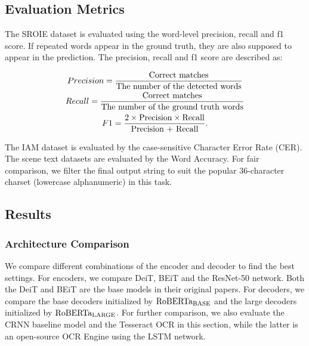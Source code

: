 \documentclass[letterpaper]{article} \usepackage{aaai23}  \usepackage{times}  \usepackage{helvet}  \usepackage{courier}  \usepackage[hyphens]{url}  \usepackage{graphicx} \urlstyle{rm} \def\UrlFont{\rm}  \usepackage{natbib}  \usepackage{caption} \frenchspacing  \setlength{\pdfpagewidth}{8.5in} \setlength{\pdfpageheight}{11in} \usepackage{algorithm}
\begin{document}
\subsection{Evaluation Metrics}
The SROIE dataset is evaluated using the word-level precision, recall and f1 score. If repeated words appear in the ground truth, they are also supposed to appear in the prediction. The precision, recall and f1 score are described as:


\begin{gather}
Precision=\frac{\text{Correct matches}}{\text{The number of the detected words}}\notag \\
Recall=\frac{\text{Correct matches}}{\text{The number of the ground truth words}}\notag \\
F1=\frac{\text{2} \times \text{Precision} \times \text{Recall}}{\text{Precision + Recall}}\notag.
\end{gather}  


The IAM dataset is evaluated by the case-sensitive Character Error Rate (CER).
The scene text datasets are evaluated by the Word Accuracy. For fair comparison, we filter the final output string to suit the popular 36-character charset (lowercase alphanumeric) in this task.






\subsection{Results}

\subsubsection{Architecture Comparison}

We compare different combinations of the encoder and decoder to find the best settings. For encoders, we compare DeiT, BEiT and the ResNet-50 network. Both the DeiT and BEiT are the base models in their original papers. For decoders, we compare the base decoders initialized by $\textrm{RoBERTa}_{\rm BASE}$ and the large decoders initialized by $\textrm{RoBERTa}_{\rm LARGE}$. 
For further comparison, we also evaluate the CRNN baseline model and the Tesseract OCR in this section, while the latter is an open-source OCR Engine using the LSTM network.
\end{document}
